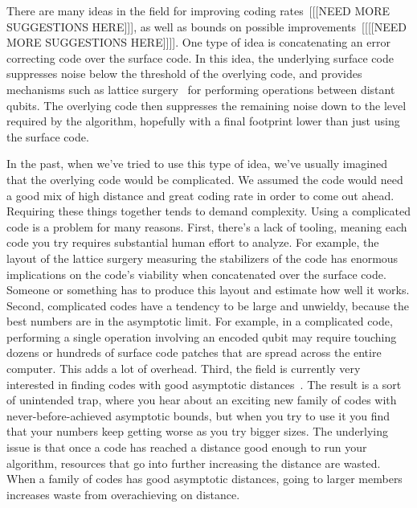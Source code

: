 \documentclass[onecolumn,unpublished,a4paper]{quantumarticle}
\theoremstyle{definition}
\theoremstyle{definition}
\theoremstyle{definition}
\begin{document}
There are many ideas in the field for improving coding rates~\cite{tremblay2022ldpc,higgott2021hyperbolic,bravyi2011subsystembacon,berthusen2023partialmeasure}[[[NEED MORE SUGGESTIONS HERE]]], as well as bounds on possible improvements~\cite{pattison2023planarcircuitbounds}[[[[NEED MORE SUGGESTIONS HERE]]]].
One type of idea is concatenating an error correcting code over the surface code.
In this idea, the underlying surface code suppresses noise below the threshold of the overlying code, and provides mechanisms such as lattice surgery~\cite{fowler2018latticesurgery,litinski2019gameofsurfacecodes} for performing operations between distant qubits.
The overlying code then suppresses the remaining noise down to the level required by the algorithm, hopefully with a final footprint lower than just using the surface code.

In the past, when we've tried to use this type of idea, we've usually imagined that the overlying code would be complicated.
We assumed the code would need a good mix of high distance and great coding rate in order to come out ahead.
Requiring these things together tends to demand complexity.
Using a complicated code is a problem for many reasons.
First, there's a lack of tooling, meaning each code you try requires substantial human effort to analyze.
For example, the layout of the lattice surgery measuring the stabilizers of the code has enormous implications on the code's viability when concatenated over the surface code.
Someone or something has to produce this layout and estimate how well it works.
Second, complicated codes have a tendency to be large and unwieldy, because the best numbers are in the asymptotic limit.
For example, in a complicated code, performing a single operation involving an encoded qubit may require touching dozens or hundreds of surface code patches that are spread across the entire computer.
This adds a lot of overhead.
Third, the field is currently very interested in finding codes with good asymptotic distances~\cite{panteleev2021}.
The result is a sort of unintended trap, where you hear about an exciting new family of codes with never-before-achieved asymptotic bounds, but when you try to use it you find that your numbers keep getting worse as you try bigger sizes.
The underlying issue is that once a code has reached a distance good enough to run your algorithm, resources that go into further increasing the distance are wasted.
When a family of codes has good asymptotic distances, going to larger members increases waste from overachieving on distance.
\end{document}
